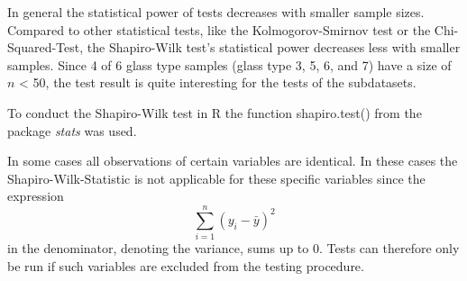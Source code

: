 \documentclass[a4paper, 12pt, titlepage, headsepline, listof = totoc, bibliography = totoc, numbers = noenddot]{scrartcl}
\begin{document}
In general the statistical power of tests decreases with smaller sample sizes. Compared to other statistical tests, like the Kolmogorov-Smirnov test or the Chi-Squared-Test, the Shapiro-Wilk test's statistical power decreases less with smaller samples. Since 4 of 6 glass type samples (glass type 3, 5, 6, and 7) have a size of $n$ < 50, the test result is quite interesting for the tests of the subdatasets.

To conduct the Shapiro-Wilk test in R the function shapiro.test() from the package \textit{stats} was used.

In some cases all observations of certain variables are identical. In these cases the Shapiro-Wilk-Statistic is not applicable for these specific variables since the expression 
\[ \sum \limits_{i=1}^n (y_i - \bar{y})^2 \]
in the denominator, denoting the variance, sums up to 0. Tests can therefore only be run if such variables are excluded from the testing procedure.
\end{document}
